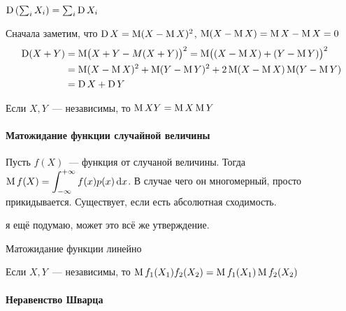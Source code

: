 \documentclass[12pt,timbord]{../../../notes}
\begin{document}
\begin{prop}\label{prop:stat::randsum::var}
  $\operatorname{\mathrm D} \left(\sum_i X_i\right) = \sum_i \operatorname{\mathrm D} X_i$
\end{prop}
\begin{itlproof}
  Сначала заметим, что $\operatorname{\mathrm D} X = \operatorname{\mathrm M} (X- \operatorname{\mathrm M} X)^2$, $\operatorname{\mathrm M} (X - \operatorname{\mathrm M} X) = \operatorname{\mathrm M} X - \operatorname{\mathrm M} X = 0$
  \[
    \begin{split}
      \operatorname{\mathrm D} (X+Y) &= \operatorname{\mathrm M} \bigl(X+Y - M(X+Y)\bigr)^2 = \operatorname{\mathrm M} \bigl((X-\operatorname{\mathrm M} X) +(Y-\operatorname{\mathrm M} Y) \bigr)^2 \\
                 &= \operatorname{\mathrm M} (X-\operatorname{\mathrm M} X)^2 + \operatorname{\mathrm M} (Y-\operatorname{\mathrm M} Y)^2 + 2 \operatorname{\mathrm M} (X-\operatorname{\mathrm M} X) \operatorname{\mathrm M} (Y - \operatorname{\mathrm M} Y)\\ 
                 &= \operatorname{\mathrm D} X + \operatorname{\mathrm D} Y
    \end{split}
  \]
\end{itlproof}

\begin{prop}\label{prop:stat::randsum::expmul}
  Если $X,Y$~--- независимы, то $\operatorname{\mathrm M} XY = \operatorname{\mathrm M} X \operatorname{\mathrm M} Y$
\end{prop}
\begin{itlproof}
  
\end{itlproof}

\paragraph{Матожидание функции случайной величины}
\label{par:stat::expfun}

\begin{defn}[$\ddot\sim$]\label{defn:stat::expfun::expfun}
  Пусть $f(X)$~--- функция от случаной величины. Тогда 
  $\displaystyle \operatorname{\mathrm M} f(X) = \int_{-\infty}^{+\infty} f(x) p(x)\, \mathrm{d} x$. В случае чего он многомерный, просто
  прикидывается. Существует, если есть абсолютная сходимость.
\end{defn}
\begin{rem*}
  я ещё подумаю, может это всё же утверждение.
\end{rem*}
\begin{prop}\label{prop:stat::expfun::lin}
  Матожидание функции линейно
\end{prop}
\begin{prop}\label{prop:stat::expfun::mul}
  Если $X,Y$~--- независимы, то $\operatorname{\mathrm M} f_1(X_1)f_2(X_2) = \operatorname{\mathrm M} f_1(X_1) \operatorname{\mathrm M} f_2(X_2)$
\end{prop}


\paragraph{Неравенство Шварца}
\label{par:stat::shwartz}
\end{document}
